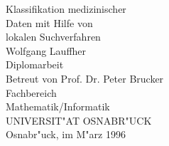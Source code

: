 \begin{titlepage}
\begin{center}

\vspace*{0.5cm}
{\Huge Klassifikation medizinischer
\\
Daten mit Hilfe von
\\
lokalen Suchverfahren
\\ }
\vspace*{3.5cm}
{\Large Wolfgang Lauffher}
\\ 
\vspace*{3.5cm}
{\Large Diplomarbeit}
\\
\vspace*{1.2cm}
{\large Betreut von Prof. Dr. Peter Brucker}
\\
\vspace*{1.2cm}
{\large Fachbereich}
\\ \vspace*{0.2cm}
{\large Mathematik/Informatik}
\\ \vspace*{0.2cm}
{\large UNIVERSIT"AT OSNABR"UCK}
\\
\vspace*{3cm}
{\large Osnabr"uck, im M"arz 1996}

\end{center}
\end{titlepage}

